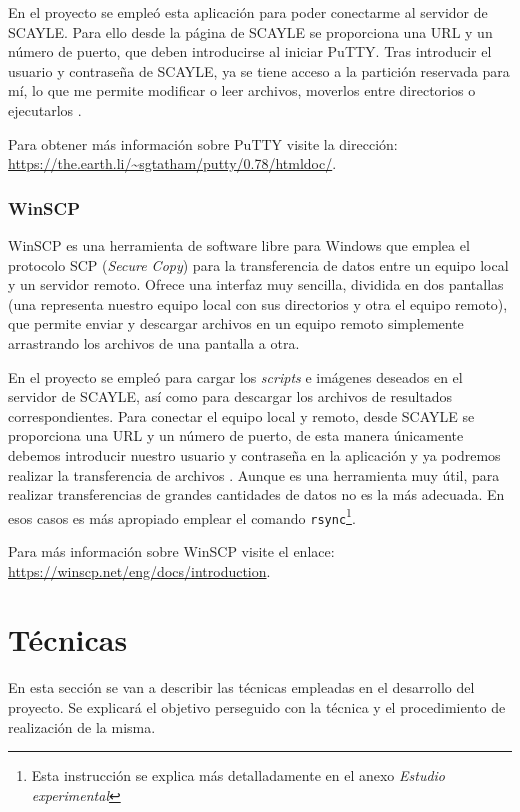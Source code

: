 En el proyecto se empleó esta aplicación para poder conectarme al servidor de SCAYLE. Para ello desde la página de SCAYLE se proporciona una URL y un número de puerto, que deben introducirse al iniciar PuTTY. Tras introducir el usuario y contraseña de SCAYLE, ya se tiene acceso a la partición reservada para mí, lo que me permite modificar o leer archivos, moverlos entre directorios o ejecutarlos \cite{met:putty}.

Para obtener más información sobre PuTTY visite la dirección: \url{https://the.earth.li/~sgtatham/putty/0.78/htmldoc/}.

\subsubsection{WinSCP}

WinSCP es una herramienta de software libre para Windows que emplea el protocolo SCP (\textit{Secure Copy}) para la transferencia de datos entre un equipo local y un servidor remoto. Ofrece una interfaz muy sencilla, dividida en dos pantallas (una representa nuestro equipo local con sus directorios y otra el equipo remoto), que permite enviar y descargar archivos en un equipo remoto simplemente arrastrando los archivos de una pantalla a otra. 

En el proyecto se empleó para cargar los \textit{scripts} e imágenes deseados en el servidor de SCAYLE, así como para descargar los archivos de resultados correspondientes. Para conectar el equipo local y remoto, desde SCAYLE se proporciona una URL y un número de puerto, de esta manera únicamente debemos introducir nuestro usuario y contraseña en la aplicación y ya podremos realizar la transferencia de archivos \cite{met:winscp}. Aunque es una herramienta muy útil, para realizar transferencias de grandes cantidades de datos no es la más adecuada. En esos casos es más apropiado emplear el comando \texttt{rsync}\footnote{Esta instrucción se explica más detalladamente en el anexo \textit{Estudio experimental}}.

Para más información sobre WinSCP visite el enlace: \url{https://winscp.net/eng/docs/introduction}.

\section{Técnicas}

En esta sección se van a describir las técnicas empleadas en el desarrollo del proyecto. Se explicará el objetivo perseguido con la técnica y el procedimiento de realización de la misma.

